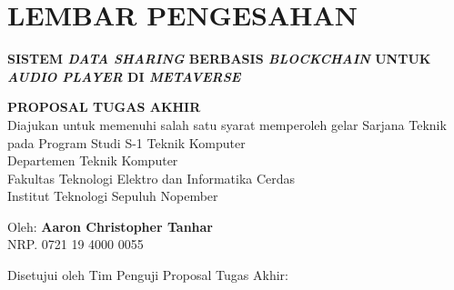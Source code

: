 \chapter*{LEMBAR PENGESAHAN}

\thispagestyle{empty}

\begin{center}
  \textbf{SISTEM \emph{DATA SHARING} BERBASIS \emph{BLOCKCHAIN} UNTUK \emph{AUDIO PLAYER}
    DI \emph{METAVERSE}}
\end{center}

\begingroup
\small

\begin{center}
  \textbf{PROPOSAL TUGAS AKHIR} \\
  Diajukan untuk memenuhi salah satu syarat memperoleh gelar
  Sarjana Teknik pada
  Program Studi S-1 Teknik Komputer \\
  Departemen Teknik Komputer \\
  Fakultas Teknologi Elektro dan Informatika Cerdas \\
  Institut Teknologi Sepuluh Nopember
\end{center}

\begin{center}
  Oleh: \textbf{Aaron Christopher Tanhar} \\
  NRP. 0721 19 4000 0055
\end{center}

\begin{center}
  Disetujui oleh Tim Penguji Proposal Tugas Akhir:
\end{center}

\begingroup
\setlength{\tabcolsep}{0pt}

